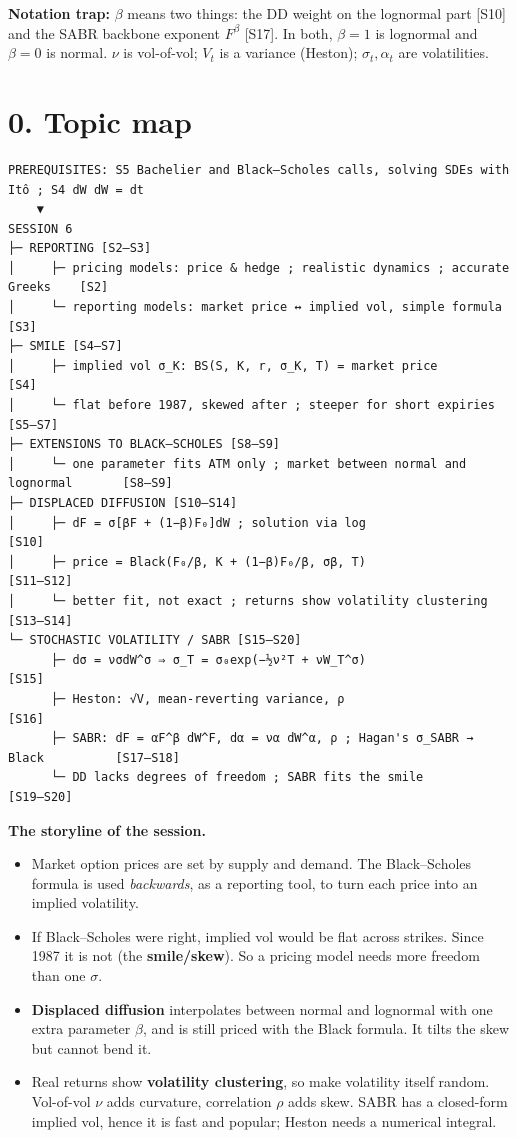 \documentclass[10pt]{article}
\begin{document}
\textbf{Notation trap:} $\beta$ means two things: the DD weight on the lognormal part [S10] and the SABR backbone exponent $F^\beta$ [S17]. In both, $\beta=1$ is lognormal and $\beta=0$ is normal. $\nu$ is vol-of-vol; $V_t$ is a variance (Heston); $\sigma_t,\alpha_t$ are volatilities.

\section*{0. Topic map}
\begin{lstlisting}
PREREQUISITES: S5 Bachelier and Black–Scholes calls, solving SDEs with Itô ; S4 dW dW = dt
    ▼
SESSION 6
├─ REPORTING [S2–S3]
│     ├─ pricing models: price & hedge ; realistic dynamics ; accurate Greeks    [S2]
│     └─ reporting models: market price ↔ implied vol, simple formula            [S3]
├─ SMILE [S4–S7]
│     ├─ implied vol σ_K: BS(S, K, r, σ_K, T) = market price                     [S4]
│     └─ flat before 1987, skewed after ; steeper for short expiries            [S5–S7]
├─ EXTENSIONS TO BLACK–SCHOLES [S8–S9]
│     └─ one parameter fits ATM only ; market between normal and lognormal       [S8–S9]
├─ DISPLACED DIFFUSION [S10–S14]
│     ├─ dF = σ[βF + (1−β)F₀]dW ; solution via log                              [S10]
│     ├─ price = Black(F₀/β, K + (1−β)F₀/β, σβ, T)                               [S11–S12]
│     └─ better fit, not exact ; returns show volatility clustering             [S13–S14]
└─ STOCHASTIC VOLATILITY / SABR [S15–S20]
      ├─ dσ = νσdW^σ ⇒ σ_T = σ₀exp(−½ν²T + νW_T^σ)                               [S15]
      ├─ Heston: √V, mean-reverting variance, ρ                                  [S16]
      ├─ SABR: dF = αF^β dW^F, dα = να dW^α, ρ ; Hagan's σ_SABR → Black          [S17–S18]
      └─ DD lacks degrees of freedom ; SABR fits the smile                       [S19–S20]
\end{lstlisting}
\textbf{The storyline of the session.}
\begin{itemize}
\item Market option prices are set by supply and demand. The Black--Scholes formula is used \emph{backwards}, as a reporting tool, to turn each price into an implied volatility.
\item If Black--Scholes were right, implied vol would be flat across strikes. Since 1987 it is not (the \textbf{smile/skew}). So a pricing model needs more freedom than one $\sigma$.
\item \textbf{Displaced diffusion} interpolates between normal and lognormal with one extra parameter $\beta$, and is still priced with the Black formula. It tilts the skew but cannot bend it.
\item Real returns show \textbf{volatility clustering}, so make volatility itself random. Vol-of-vol $\nu$ adds curvature, correlation $\rho$ adds skew. SABR has a closed-form implied vol, hence it is fast and popular; Heston needs a numerical integral.
\end{itemize}
\end{document}
